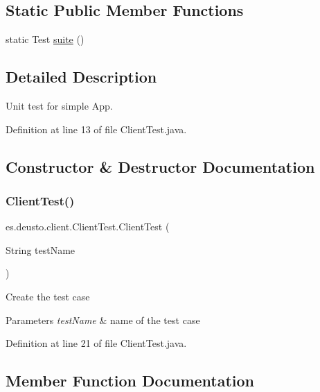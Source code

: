 \subsection*{Static Public Member Functions}
\begin{DoxyCompactItemize}
\item 
static Test \hyperlink{classes_1_1deusto_1_1client_1_1_client_test_a722a329c5978bafaf821de257fc762c8}{suite} ()
\end{DoxyCompactItemize}


\subsection{Detailed Description}
Unit test for simple App. 

Definition at line 13 of file Client\+Test.\+java.



\subsection{Constructor \& Destructor Documentation}
\mbox{\label{classes_1_1deusto_1_1client_1_1_client_test_a452050f3521bf56054ec20630a137e02}} 
\subsubsection{\texorpdfstring{Client\+Test()}{ClientTest()}}
{\footnotesize\ttfamily es.\+deusto.\+client.\+Client\+Test.\+Client\+Test (\begin{DoxyParamCaption}\item[{String}]{test\+Name }\end{DoxyParamCaption})}

Create the test case


\begin{DoxyParams}{Parameters}
{\em test\+Name} & name of the test case \\
\hline
\end{DoxyParams}


Definition at line 21 of file Client\+Test.\+java.



\subsection{Member Function Documentation}
\mbox{\label{classes_1_1deusto_1_1client_1_1_client_test_a722a329c5978bafaf821de257fc762c8}} 
